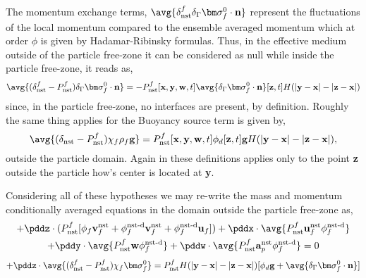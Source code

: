 The momentum exchange terms, $\avg{\delta_\text{nst}^f \delta_\Gamma \bm\sigma_f^0 \cdot \textbf{n}}$ represent the fluctuations of the local momentum compared to the ensemble averaged momentum which at order $\phi$ is given by Hadamar-Ribinsky formulas.
Thus, in the effective medium outside of the particle free-zone it can be considered as null while inside the particle free-zone, it reads as, 
\begin{equation}
    \avg{(\delta_\text{nst}^f - P_\text{nst}^f) \delta_\Gamma \bm\sigma_f^0 \cdot \textbf{n}}
    = - P_\text{nst}^f [\textbf{x},\textbf{y},\textbf{w},t]
    \avg{\delta_\Gamma \bm\sigma_f^0 \cdot \textbf{n}}[\textbf{z},t]
    H(|\textbf{y} - \textbf{x}| - |\textbf{z} - \textbf{x}|) 
\end{equation}
since, in the particle free-zone, no interfaces are present, by definition. 
Roughly the same thing applies for the Buoyancy source term is given by, 
\begin{equation*}
    \avg{(\delta_\text{nst} - P_\text{nst}^f) \chi_f \rho_f \textbf{g}}
    = 
    P_\text{nst}^f [\textbf{x},\textbf{y},\textbf{w},t]
    \phi_d [\textbf{z},t]
    \textbf{g} H(|\textbf{y} - \textbf{x}| - |\textbf{z} - \textbf{x}|), 
\end{equation*}
outside the particle domain. 
Again in these definitions applies only to the point \textbf{z} outside the particle how's center is located at \textbf{y}. 



Considering all of these hypotheses we may re-write the mass and momentum conditionally averaged equations in the domain outside the particle free-zone as, 
\begin{multline}
    +  \pddz \cdot (P_\text{nst}^f [
    \phi_f  \textbf{v}_f^\text{nst} 
    +\phi_f^\text{nst-d}  \textbf{v}_f^\text{nst} 
    +\phi_f^\text{nst-d}  \textbf{u}_f 
    ])
    +  \pddx \cdot \avg{P_\text{nst}^f\textbf{u}_f^\text{nst} \phi_f^\text{nst-d}}\\
    +  \pddy \cdot \avg{P_\text{nst}^f \textbf{w} \phi_f^\text{nst-d}}
    +  \pddw \cdot \avg{P_\text{nst}^f \textbf{a}_p^\text{nst} \phi_f^\text{nst-d}}
    = 0
    \label{eq:mass_nst_d_stokes}
\end{multline}
\begin{equation}
    + \pddz\cdot \avg{ (\delta_\text{nst}^f - P_\text{nst}^f) \chi_f \bm\sigma_f^0}
    = 
    P_\text{nst}^f 
    H(|\textbf{y} - \textbf{x}| - |\textbf{z} - \textbf{x}|)
    [
        \phi_d \textbf{g}
        + 
        \avg{\delta_\Gamma \bm\sigma_f^0 \cdot \textbf{n}}
    ]
    \label{eq:momentum_nst_d_stokes}
\end{equation}

